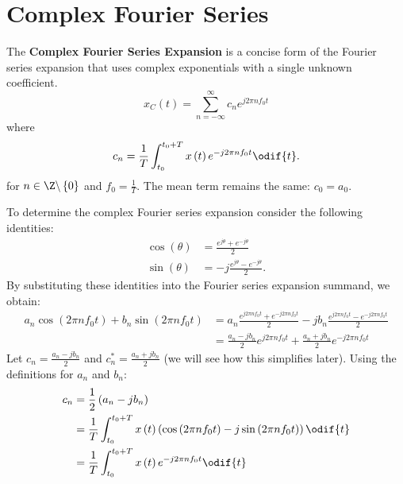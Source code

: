 \documentclass{article}
\begin{document}
\section{Complex Fourier Series}
\begin{definition}
    The \textbf{Complex Fourier Series Expansion} is a concise form of the Fourier series expansion that uses complex exponentials with a single unknown coefficient.
    \begin{equation*}
        x_C\left( t \right) = \sum_{n = -\infty}^\infty c_n e^{j 2\pi n f_0 t}
    \end{equation*}
    where
    \begin{equation*}
        c_n = \frac{1}{T} \int_{t_0}^{t_0 + T} x\left( t \right) e^{-j 2\pi n f_0 t} \odif{t}.
    \end{equation*}
    for \(n \in \Z\backslash \left\{ 0 \right\}\) and \(f_0 = \frac{1}{T}\).
    The mean term remains the same: \(c_0 = a_0\).
\end{definition}
To determine the complex Fourier series expansion consider the following identities:
\begin{align*}
    \cos{\left( \theta \right)} & = \frac{e^{j \theta} + e^{-j \theta}}{2}     \\
    \sin{\left( \theta \right)} & = -j \frac{e^{j \theta} - e^{-j \theta}}{2}.
\end{align*}
By substituting these identities into the Fourier series expansion summand, we obtain:
\begin{align*}
    a_n \cos{\left( 2\pi n f_0 t \right)} + b_n \sin{\left( 2\pi n f_0 t \right)} & = a_n \frac{e^{j 2\pi n f_0 t} + e^{-j 2\pi n f_0 t}}{2} -j b_n \frac{e^{j 2\pi n f_0 t} - e^{-j 2\pi n f_0 t}}{2} \\
                                                                                  & = \frac{a_n - j b_n}{2} e^{j 2\pi n f_0 t} + \frac{a_n + j b_n}{2} e^{-j 2\pi n f_0 t}
\end{align*}
Let \(c_n = \frac{a_n - j b_n}{2}\) and \(c_n^\ast = \frac{a_n + j b_n}{2}\) (we will see how this simplifies later).
Using the definitions for \(a_n\) and \(b_n\):
\begin{align*}
    c_n & = \frac{1}{2} \left( a_n - j b_n \right)                                                                                                            \\
        & = \frac{1}{T} \int_{t_0}^{t_0 + T} x\left( t \right) \left( \cos{\left( 2\pi n f_0 t \right)} -j \sin{\left( 2\pi n f_0 t \right)} \right) \odif{t} \\
        & = \frac{1}{T} \int_{t_0}^{t_0 + T} x\left( t \right) e^{-j 2\pi n f_0 t} \odif{t}
\end{align*}
\end{document}
